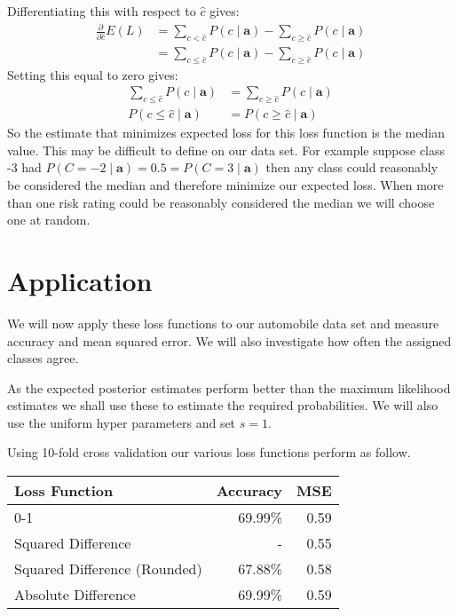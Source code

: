 Differentiating this with respect to $\hat{c}$ gives:
\begin{align}
	\frac{\partial}{\partial \hat{c}} E(L) & = \sum_{c < \hat{c}} P(c \mid \mathbf{a}) - \sum_{c \geq \hat{c}} P(c \mid \mathbf{a}) \\
	& = \sum_{c \leq \hat{c}} P(c \mid \mathbf{a}) - \sum_{c \geq \hat{c}} P(c \mid \mathbf{a})
\end{align}
Setting this equal to zero gives:
\begin{align}
	\sum_{c \leq \hat{c}} P(c \mid \mathbf{a}) & = \sum_{c \geq \hat{c}} P(c \mid \mathbf{a}) \\
	P(c \leq \hat{c} \mid \mathbf{a}) & = P(c \geq \hat{c} \mid \mathbf{a})
\end{align}
So the estimate that minimizes expected loss for this loss function is the median value.
This may be difficult to define on our data set.
For example suppose class -3 had $P(C = -2 \mid \mathbf{a}) = 0.5 = P(C=3 \mid \mathbf{a})$ then any class could reasonably be considered the median and therefore minimize our expected loss.
When more than one risk rating could be reasonably considered the median we will choose one at random.

\section{Application}
We will now apply these loss functions to our automobile data set and measure accuracy and mean squared error.
We will also investigate how often the assigned classes agree.

As the expected posterior estimates perform better than the maximum likelihood estimates we shall use these to estimate the required probabilities.
We will also use the uniform hyper parameters and set $s=1$.

Using 10-fold cross validation our various loss functions perform as follow.

\begin{center}
	\begin{tabular}{l r r}
		\hline
		Loss Function                & Accuracy & MSE  \\
		\hline
		0-1                          & 69.99\%  & 0.59 \\
		Squared Difference           & -        & 0.55 \\
		Squared Difference (Rounded) & 67.88\%  & 0.58 \\
		Absolute Difference          & 69.99\%  & 0.59 \\
		\hline
	\end{tabular}
\end{center}

